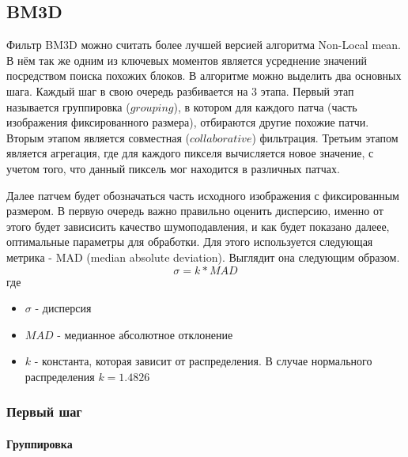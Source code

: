 \subsection{BM3D}
Фильтр BM3D можно считать более лучшей версией алгоритма Non-Local mean. В нём так же одним из ключевых моментов является
усреднение значений посредством поиска похожих блоков. В алгоритме можно выделить два основных шага. Каждый шаг в свою очередь разбивается на 3 этапа. Первый этап называется группировка ($grouping$), в котором для каждого патча (часть изображения фиксированного размера), отбираются другие похожие патчи. Вторым этапом является совместная ($collaborative$) фильтрация. Третьим этапом является агрегация, где для каждого пикселя вычисляется новое значение, с учетом того, что данный пиксель мог находится в различных патчах.
\begin{figure}
	
\end{figure}
Далее патчем будет обозначаться часть исходного изображения с фиксированным размером.
В первую очередь важно правильно оценить дисперсию, именно от этого будет зависисить качество шумоподавления, и как будет показано далеее, оптимальные параметры для обработки.
Для этого используется следующая метрика - MAD (median absolute deviation). Выглядит она следующим образом.
\begin{equation}
	\sigma = k * MAD
\end{equation}
где
\begin{itemize}
	\item $\sigma$ - дисперсия
	\item $MAD$ - медианное абсолютное отклонение
	\item $k$ - константа, которая зависит от распределения. В случае нормального распределения $k=1.4826$%
	
\end{itemize}
\subsubsection{Первый шаг}
\paragraph{Группировка}\

